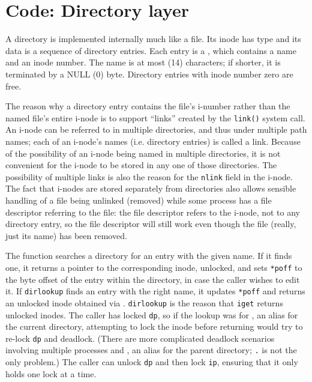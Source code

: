 \section{Code: Directory layer}

A directory is implemented internally much like a file.
Its inode has type
and its data is a sequence of directory entries.
Each entry is a
,
which contains a name and an inode number.
The name is at most
(14) characters;
if shorter, it is terminated by a NULL (0) byte.
Directory entries with inode number zero are free.

The reason why a directory entry contains the file's i-number rather
than the named file's entire i-node is to support ``links'' created by
the {\tt link()} system call. An i-node can be referred to in multiple
directories, and thus under multiple path names; each of an i-node's
names (i.e. directory entries) is called a link. Because of the
possibility of an i-node being named in multiple directories, it is
not convenient for the i-node to be stored in any one of those
directories. The possibility of multiple links is also the reason for
the {\tt nlink} field in the i-node. The fact that i-nodes are stored
separately from directories also allows sensible handling of a file
being unlinked (removed) while some process has a file descriptor
referring to the file: the file descriptor refers to the i-node, not
to any directory entry, so the file descriptor will still work even
though the file (really, just its name) has been removed.

The function
searches a directory for an entry with the given name.
If it finds one, it returns a pointer to the corresponding inode, unlocked,
and sets 
\lstinline{*poff}
to the byte offset of the entry within the directory,
in case the caller wishes to edit it.
If
\lstinline{dirlookup}
finds an entry with the right name,
it updates
\lstinline{*poff}
and returns an unlocked inode
obtained via
.
\lstinline{dirlookup}
is the reason that 
\lstinline{iget}
returns unlocked inodes.
The caller has locked
\lstinline{dp},
so if the lookup was for
,
an alias for the current directory,
attempting to lock the inode before
returning would try to re-lock
\lstinline{dp}
and deadlock.
(There are more complicated deadlock scenarios involving
multiple processes and
,
an alias for the parent directory;
\lstinline{.}
is not the only problem.)
The caller can unlock
\lstinline{dp}
and then lock
\lstinline{ip},
ensuring that it only holds one lock at a time.

